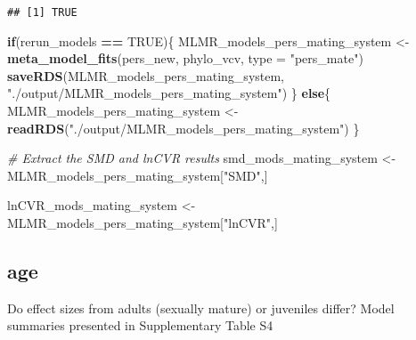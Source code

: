 \documentclass[]{article}
\newenvironment{Shaded}{\begin{snugshade}}{\end{snugshade}}
\newcommand{\KeywordTok}[1]{\textcolor[rgb]{0.13,0.29,0.53}{\textbf{#1}}}
\newcommand{\DataTypeTok}[1]{\textcolor[rgb]{0.13,0.29,0.53}{#1}}
\newcommand{\StringTok}[1]{\textcolor[rgb]{0.31,0.60,0.02}{#1}}
\newcommand{\CommentTok}[1]{\textcolor[rgb]{0.56,0.35,0.01}{\textit{#1}}}
\newcommand{\OtherTok}[1]{\textcolor[rgb]{0.56,0.35,0.01}{#1}}
\newcommand{\ControlFlowTok}[1]{\textcolor[rgb]{0.13,0.29,0.53}{\textbf{#1}}}
\newcommand{\OperatorTok}[1]{\textcolor[rgb]{0.81,0.36,0.00}{\textbf{#1}}}
\newcommand{\NormalTok}[1]{#1}
\begin{document}
\begin{verbatim}
## [1] TRUE
\end{verbatim}

\begin{Shaded}
\begin{Highlighting}[]
    \ControlFlowTok{if}\NormalTok{(rerun_models }\OperatorTok{==}\StringTok{ }\OtherTok{TRUE}\NormalTok{)\{}
\NormalTok{      MLMR_models_pers_mating_system <-}\StringTok{ }\KeywordTok{meta_model_fits}\NormalTok{(pers_new, phylo_vcv, }\DataTypeTok{type =} \StringTok{"pers_mate"}\NormalTok{)}
      \KeywordTok{saveRDS}\NormalTok{(MLMR_models_pers_mating_system, }\StringTok{"./output/MLMR_models_pers_mating_system"}\NormalTok{)}
\NormalTok{    \} }\ControlFlowTok{else}\NormalTok{\{}
\NormalTok{     MLMR_models_pers_mating_system <-}\StringTok{ }\KeywordTok{readRDS}\NormalTok{(}\StringTok{"./output/MLMR_models_pers_mating_system"}\NormalTok{)}
\NormalTok{    \}}

\CommentTok{# Extract the SMD and lnCVR results}
\NormalTok{    smd_mods_mating_system <-}\StringTok{ }\NormalTok{MLMR_models_pers_mating_system[}\StringTok{"SMD"}\NormalTok{,]}
      
\NormalTok{    lnCVR_mods_mating_system <-}\StringTok{ }\NormalTok{MLMR_models_pers_mating_system[}\StringTok{"lnCVR"}\NormalTok{,]}
\end{Highlighting}
\end{Shaded}

\subsection{age}\label{age}

Do effect sizes from adults (sexually mature) or juveniles differ? Model
summaries presented in Supplementary Table S4

\begin{Shaded}
\end{Shaded}
\end{document}
